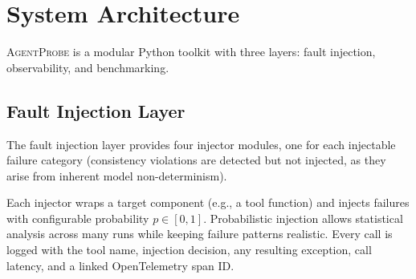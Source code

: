 \documentclass[make,article,submit,moreauthors,pdftex]{mdpi}
\providecommand{\agentprobe}{\textsc{AgentProbe}}
\begin{document}
\begin{table}[htbp]
\caption{Failure taxonomy summary. Each category maps to an \agentprobe{} injector module and is detected by the observer layer's failure classifier.}\label{tab:taxonomy}
\centering
{}
\end{table}


\section{System Architecture}\label{sec:system}

\agentprobe{} is a modular Python toolkit with three layers: fault injection, observability, and benchmarking.

\subsection{Fault Injection Layer}

The fault injection layer provides four injector modules, one for each injectable failure category (consistency violations are detected but not injected, as they arise from inherent model non-determinism).

Each injector wraps a target component (e.g., a tool function) and injects failures with configurable probability $p \in [0, 1]$. Probabilistic injection allows statistical analysis across many runs while keeping failure patterns realistic. Every call is logged with the tool name, injection decision, any resulting exception, call latency, and a linked OpenTelemetry span ID.
\end{document}
